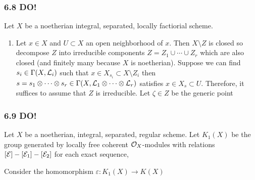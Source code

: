\documentclass[12pt]{article}
\begin{document}
\subsubsection{6.8 DO!}

Let $X$ be a noetherian integral, separated, locally factiorial scheme.

\begin{enumerate}
\item Let $x \in X$ and $U \subset X$ an open neighborhood of $x$. Then $X \setminus Z$ is closed so decompose $Z$ into irreducible components $Z = Z_1 \cup \cdots \cup Z_r$ which are also closed (and finitely many because $X$ is noetherian). Suppose we can find $s_i \in \Gamma(X, \mathcal{L}_i)$ such that $x \in X_{s_i} \subset X \setminus Z_i$ then $s = s_1 \otimes \cdots \otimes s_r \in \Gamma(X, \mathcal{L}_1 \otimes \cdots \otimes \mathcal{L}_r)$ satisfies $x \in X_s \subset U$. Therefore, it suffices to assume that $Z$ is irreducible. Let $\zeta \in Z$ be the generic point 
\end{enumerate}

\subsubsection{6.9 DO!}

Let $X$ be a noetherian, integral, separated, regular scheme. Let $K_1(X)$ be the group generated by locally free coherent $\mathcal{O}_{X}$-modules with relations $[\mathcal{E}] - [\mathcal{E}_1] - [\mathcal{E}_2]$ for each exact sequence,
\begin{center}
\end{center}
Consider the homomorphism $\varepsilon : K_1(X) \to K(X)$
\end{document}
